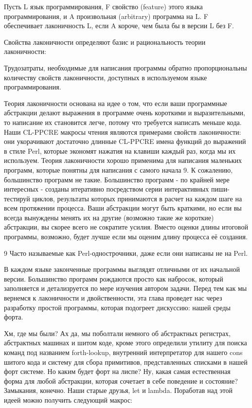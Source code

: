 Пусть L язык программирования, F свойство (feature) этого языка программирования, и A произвольная (arbitrary) программа на L. F обеспечивает лаконичность L, если A короче, чем была бы в версии L без F. 

Свойства лаконичности определяют базис и рациональность теории лаконичности:

Трудозатраты, необходимые для написания программы обратно пропорциональны количеству свойств лаконичности, доступных в используемом языке программирования.

Теория лаконичности основана на идее о том, что если ваши программные абстракции делают выражения в программе очень короткими и выразительными, то написание их становится легче, потому что требуется написать меньше кода. Наши CL-PPCRE макросы чтения являются примерами свойств лаконичности: они укорачивают достаточно длинные CL-PPCRE имена функций до выражений в стиле Perl, которые экономят нажатия на клавиши каждый раз, когда мы их используем. Теория лаконичности хорошо применима для написания маленьких программ, которые понятны для написания с самого начала 9. К сожалению, большинство программ не такие. Большинство программ - по крайней мере интересных - созданы итеративно посредством серии интерактивных пиши-тестируй циклов, результаты которых принимаются в расчет на каждом шаге на всем протяжении процесса. Ваши абстракции могут быть краткими, но если вы всегда вынуждены менять их на другие (возможно такие же короткие) абстракции, вы скорее всего не сократите усилия. Вместо оценки длины итоговой программы, возможно, будет лучше если мы оценим длину процесса её создания.

9 Часто называемые как Perl-однострочники, даже если они написаны не на Perl.

В каждом языке законченные программы выглядят отличными от их начальной версии. Большинство программ рождаются просто как набросок, который заполняется и детализруется по мере изучения автором задачи. Перед тем как мы вернемся к лаконичности и двойственности, эта глава проведет нас через разработку простой программы, которая подогреет дискуссию: нашей среды форта.

Хм, где мы были? Ах да, мы поболтали немного об абстрактных регистрах, абстрактных машинах и шитом коде, кроме этого определили утилиту для поиска команд под названием forth-lookup, внутренний интерпретатор для нашего cons шитого кода и систему для сбора примитивов, представленных списками в нашей форт системе. Но каким будет форт на лиспе? Ну, какая самая естественная форма для любой абстракции, которая сочетает в себе поведение и состояние? Замыкания, конечно. Наши старые друзья, let и lambda. Поработав над этой идеей можно получить следующий макрос: 

